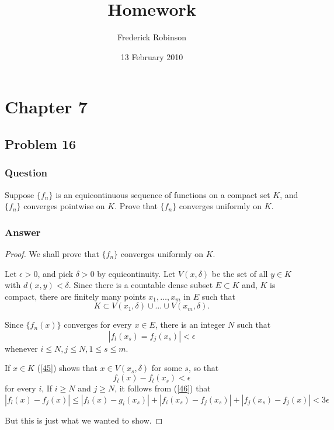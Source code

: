 \documentclass[12pt]{article}
\title{Homework}
\author{Frederick Robinson}
\date{13 February 2010}
\begin{document}

   \maketitle

\setcounter{tocdepth}{2} 


\section{Chapter 7}
\subsection{Problem 16}

\subsubsection{Question}
Suppose $\{f_n\}$ is an equicontinuous sequence of functions on a compact set $K$, and $\{f_n\}$ converges pointwise on $K$. Prove that $\{f_n\}$ converges uniformly on $K$.
\subsubsection{Answer}


\begin{proof}
We shall prove that $\{f_n\}$ converges uniformly on $K$.

Let $\epsilon>0$, and pick $\delta > 0$ by equicontinuity. Let $V(x,\delta)$ be the set of all $y \in K $ with $d(x,y)< \delta$. Since there is a countable dense subset $E \subset K$ and, $K$ is compact, there are finitely many points $x_1, \dots, x_m$ in $E$ such that
\begin{equation}\label{45}K \subset V(x_1, \delta) \cup \dots \cup V(x_m,\delta).\end{equation}

Since $\{f_n(x)\}$ converges for every $x \in E$, there is an integer $N$ such that
\begin{equation}\label{46} |f_l(x_s)=f_j(x_s)| < \epsilon \end{equation}
whenever $i \leq N, j \leq N, 1\leq  s \leq m.$

If $x \in K$ (\ref{45}) shows that $x \in V(x_s,\delta)$ for some $s$, so that
\[ f_l(x)-f_l(x_s) < \epsilon \]
for every $i$, If $i \geq N$ and $j \geq N$, it follows from (\ref{46}) that 
\[ |f_l(x)-f_j(x)|\leq |f_i(x) - g_i(x_s)| + |f_i(x_s)-f_j(x_s)| + |f_j(x_s) -f_j(x)| < 3 \epsilon\]

But this is just what we wanted to show.

\end{proof}
\end{document}
